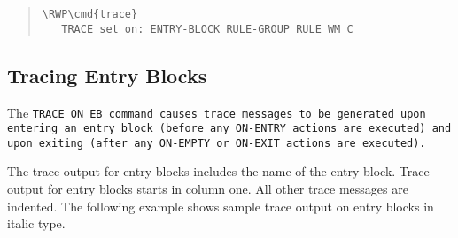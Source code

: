 \begin{quote}
\begin{Verbatim}[commandchars=\\\{\}]
\RWP\cmd{trace}
   TRACE set on: ENTRY-BLOCK RULE-GROUP RULE WM C
\end{Verbatim}
\end{quote}

\subsection{Tracing Entry Blocks}

The \tt{TRACE ON EB} command causes trace messages to be generated
upon entering an entry block (before any \tt{ON-ENTRY} actions are
executed) and upon exiting (after any \tt{ON-EMPTY} or \tt{ON-EXIT}
actions are executed).

The trace output for entry blocks includes the name of the entry
block. Trace output for entry blocks starts in column one. All
other trace messages are indented. The following example shows
sample trace output on entry blocks in italic type.

